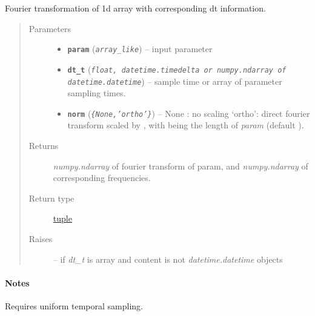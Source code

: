 \documentclass[letterpaper,10pt,english]{sphinxhowto}
\begin{document}
\begin{fulllineitems}
\label{swtools_doc:swtools.fourier_transform}
Fourier transformation of 1d array with corresponding dt information.
\begin{quote}\begin{description}
\item[{Parameters}] \leavevmode\begin{itemize}
\item {} 
\textbf{\texttt{param}} (\emph{\texttt{array\_like}}) -- input parameter

\item {} 
\textbf{\texttt{dt\_t}} (\emph{\texttt{float, datetime.timedelta or numpy.ndarray of datetime.datetime}}) -- sample time or array of parameter sampling times.

\item {} 
\textbf{\texttt{norm}} (\emph{\texttt{\{None,'ortho'\}}}) -- None : no scaling
`ortho': direct fourier transform scaled by , with
 being the length of \emph{param} (default ).

\end{itemize}

\item[{Returns}] \leavevmode
\emph{numpy.ndarray} of fourier transform of param, and \emph{numpy.ndarray} of
corresponding frequencies.

\item[{Return type}] \leavevmode
\href{https://docs.python.org/library/functions.html\#tuple}{tuple}

\item[{Raises}] \leavevmode
{} --
if \emph{dt\_t} is array and content is not \emph{datetime.datetime} objects

\end{description}\end{quote}
\paragraph{Notes}

Requires uniform temporal sampling.

\end{fulllineitems}

\end{document}
